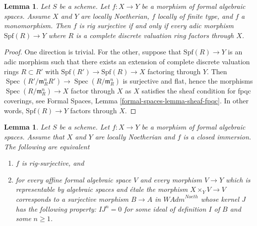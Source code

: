 \documentclass{stacks-project}
\theoremstyle{plain}
\newtheorem{lemma}[subsection]{Lemma}
\theoremstyle{definition}
\theoremstyle{remark}
\numberwithin{equation}{subsection}
\def\Spec{\mathop{\mathrm{Spec}}}
\begin{document}
\begin{lemma}
\label{lemma-monomorphism-rig-surjective}
Let $S$ be a scheme. Let $f : X \to Y$ be a morphism of formal algebraic
spaces. Assume $X$ and $Y$ are locally Noetherian, $f$ locally of finite
type, and $f$ a monomorphism. Then $f$ is rig surjective if and only if
every adic morphism $\text{Spf}(R) \to Y$ where $R$ is a complete discrete
valuation ring factors through $X$.
\end{lemma}

\begin{proof}
One direction is trivial. For the other, suppose that $\text{Spf}(R) \to Y$
is an adic morphism such that there exists an extension of complete
discrete valuation rings $R \subset R'$ with
$\text{Spf}(R') \to \text{Spf}(R) \to X$ factoring through $Y$. Then
$\Spec(R'/\mathfrak m_R^n R') \to \Spec(R/\mathfrak m_R^n)$ is surjective
and flat, hence the morphisms $\Spec(R/\mathfrak m_R^n) \to X$ factor
through $X$ as $X$ satisfies the sheaf condition for fpqc coverings, see
Formal Spaces, Lemma \ref{formal-spaces-lemma-sheaf-fpqc}.
In other words, $\text{Spf}(R) \to Y$ factors through $X$.
\end{proof}

\begin{lemma}
\label{lemma-closed-immersion-rig-surjective}
Let $S$ be a scheme. Let $f : X \to Y$ be a morphism of formal algebraic
spaces. Assume that $X$ and $Y$ are locally Noetherian and $f$ is a
closed immersion. The following are equivalent
\begin{enumerate}
\item $f$ is rig-surjective, and
\item for every affine formal algebraic space $V$ and every morphism
$V \to Y$ which is representable by algebraic spaces and \'etale
the morphism $X \times_Y V \to V$ corresponds to a surjective morphism
$B \to A$ in $\textit{WAdm}^{Noeth}$ whose kernel $J$ has the following
property: $IJ^n = 0$ for some ideal of definition $I$ of $B$
and some $n \geq 1$.
\end{enumerate}
\end{lemma}
\end{document}

